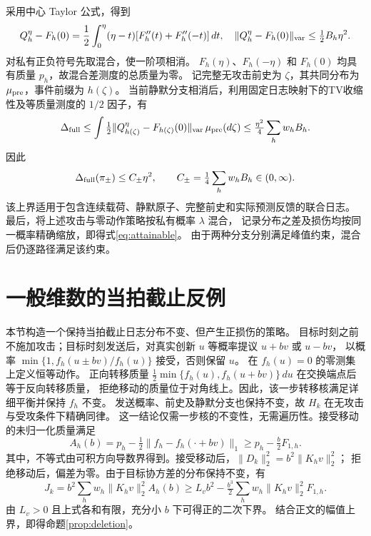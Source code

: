 采用中心 Taylor 公式，得到
\begin{equation}
 Q_h^\eta-F_h(0)=\frac12\int_0^\eta(\eta-t)[F_h''(t)+F_h''(-t)]\,dt,
 \quad \|Q_h^\eta-F_h(0)\|_{\rm var}\le\tfrac12B_h\eta^2.
\end{equation}
对私有正负符号先取混合，使一阶项相消。
$F_h(\eta)$、$F_h(-\eta)$ 和 $F_h(0)$ 均具有质量 $p_h$，故混合差测度的总质量为零。
记完整无攻击前史为 $\zeta$，其共同分布为 $\mu_{\rm pre}$，事件前缀为 $h(\zeta)$。
当前静默分支相消后，利用固定日志映射下的TV收缩性及等质量测度的 $1/2$ 因子，有
\[
 \Delta_{\rm full}\le
 \int\tfrac12\|Q_{h(\zeta)}^\eta-F_{h(\zeta)}(0)\|_{\rm var}\,\mu_{\rm pre}(d\zeta)
 \le\tfrac{\eta^2}{4}\sum_hw_hB_h.
\]
因此
\begin{equation}
 \Delta_{\rm full}(\pi_\pm)\le C_\pm\eta^2,\qquad
 C_\pm=\tfrac14\sum_hw_hB_h\in(0,\infty).
 \label{eq:Cpm}
\end{equation}
该上界适用于包含连续载荷、静默原子、完整前史和实际预测反馈的联合日志。
最后，将上述攻击与零动作策略按私有概率 $\lambda$ 混合，
记录分布之差及损伤均按同一概率精确缩放，即得式\eqref{eq:attainable}。
由于两种分支分别满足峰值约束，混合后仍逐路径满足该约束。

\section{一般维数的当拍截止反例}
\label{app:mh}
本节构造一个保持当拍截止日志分布不变、但产生正损伤的策略。
目标时刻之前不施加攻击；目标时刻发送后，对真实创新 $u$ 等概率提议 $u+bv$ 或 $u-bv$，
以概率 $\min\{1,f_h(u\pm bv)/f_h(u)\}$ 接受，否则保留 $u$。
在 $f_h(u)=0$ 的零测集上定义恒等动作。
正向转移质量 $\frac12\min\{f_h(u),f_h(u+bv)\}\,du$ 在交换端点后等于反向转移质量，
拒绝移动的质量位于对角线上。因此，该一步转移核满足详细平衡并保持 $f_h$ 不变。
发送概率、前史及静默分支也保持不变，故 $H_k$ 在无攻击与受攻条件下精确同律。
这一结论仅需一步核的不变性，无需遍历性。接受移动的未归一化质量满足
\begin{equation}
 A_h(b)=p_h-\tfrac12\|f_h-f_h(\cdot+bv)\|_1
 \ge p_h-\tfrac b2F_{1,h}.
\end{equation}
其中，不等式由可积方向导数界得到。接受移动后，$\|D_k\|_2^2=b^2\|K_hv\|_2^2$；
拒绝移动后，偏差为零。由于目标协方差的分布保持不变，有
\begin{equation}
 J_k=b^2\sum_hw_h\|K_hv\|_2^2A_h(b)
 \ge L_vb^2-\tfrac{b^3}{2}\sum_hw_h\|K_hv\|_2^2F_{1,h}.
\end{equation}
由 $L_v>0$ 且上式各和有限，充分小 $b$ 下可得正的二次下界。
结合正文的幅值上界，即得命题\ref{prop:deletion}。
